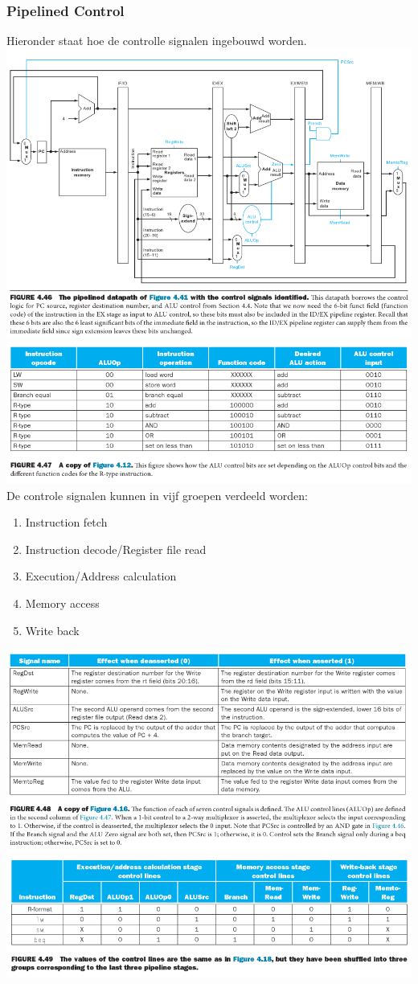 	\subsubsection*{Pipelined Control}
	Hieronder staat hoe de controlle signalen ingebouwd worden.\\
	\includegraphics[scale=0.6]{Fig4_46.png}\\
	\includegraphics[scale=0.6]{Fig4_47.png}\\
	De controle signalen kunnen in vijf groepen verdeeld worden:
	\begin{enumerate}
		\item Instruction fetch
		\item Instruction decode/Register file read
		\item Execution/Address calculation
		\item Memory access
		\item Write back
	\end{enumerate}
	\includegraphics[scale=0.6]{Fig4_48.png}\\
	\includegraphics[scale=0.6]{Fig4_49.png}\\